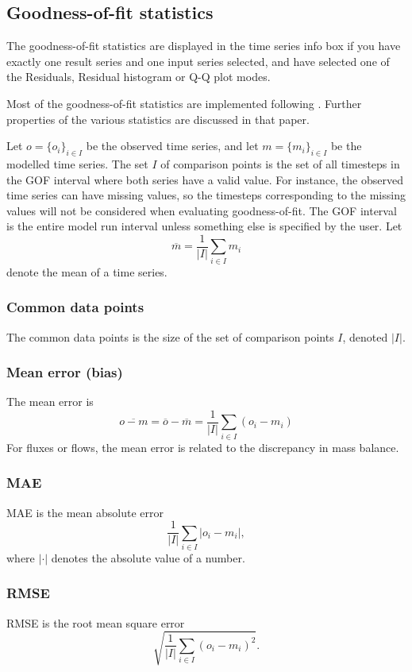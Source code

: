 \documentclass[11pt]{article}
\theoremstyle{definition}
\begin{document}
\subsection{Goodness-of-fit statistics}\label{sec:gof}

The goodness-of-fit statistics are displayed in the time series info box if you have exactly one result series and one input series selected, and have selected one of the Residuals, Residual histogram or Q-Q plot modes. 

Most of the goodness-of-fit statistics are implemented following \cite{krause05}. Further properties of the various statistics are discussed in that paper.

Let $o=\{o_i\}_{i\in I}$ be the observed time series, and let $m=\{m_i\}_{i\in I}$ be the modelled time series. The set $I$ of comparison points is the set of all timesteps in the GOF interval where both series have a valid value. For instance, the observed time series can have missing values, so the timesteps corresponding to the missing values will not be considered when evaluating goodness-of-fit. The GOF interval is the entire model run interval unless something else is specified by the user. Let
\[
\overline{m} = \frac{1}{|I|}\sum_{i\in I}m_i
\]
denote the mean of a time series.

\subsubsection{Common data points}
The common data points is the size of the set of comparison points $I$, denoted $|I|$.

\subsubsection{Mean error (bias)}
The mean error is
\[
\overline{o - m} = \overline{o} -\overline{m} =\frac{1}{|I|} \sum_{i\in I} (o_i - m_i)
\]
For fluxes or flows, the mean error is related to the discrepancy in mass balance.

\subsubsection{MAE}
MAE is the mean absolute error
\[
\frac{1}{|I|}\sum_{i\in I}|o_i - m_i|,
\]
where $|\cdot|$ denotes the absolute value of a number.

\subsubsection{RMSE}
RMSE is the root mean square error
\[
\sqrt{\frac{1}{|I|}\sum_{i\in I}(o_i-m_i)^2}.
\]
\end{document}
